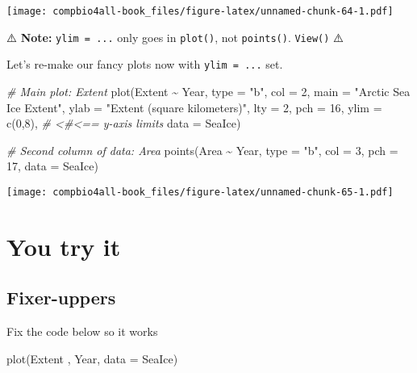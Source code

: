 \documentclass[
]{book}
\newenvironment{Shaded}{\begin{snugshade}}{\end{snugshade}}
\newcommand{\AttributeTok}[1]{\textcolor[rgb]{0.77,0.63,0.00}{#1}}
\newcommand{\CommentTok}[1]{\textcolor[rgb]{0.56,0.35,0.01}{\textit{#1}}}
\newcommand{\DecValTok}[1]{\textcolor[rgb]{0.00,0.00,0.81}{#1}}
\newcommand{\FunctionTok}[1]{\textcolor[rgb]{0.00,0.00,0.00}{#1}}
\newcommand{\NormalTok}[1]{#1}
\newcommand{\SpecialCharTok}[1]{\textcolor[rgb]{0.00,0.00,0.00}{#1}}
\newcommand{\StringTok}[1]{\textcolor[rgb]{0.31,0.60,0.02}{#1}}
\begin{document}
\texttt{[image: compbio4all-book\_files/figure-latex/unnamed-chunk-64-1.pdf]}

⚠️ \textbf{Note:} \texttt{ylim\ =\ ...} only goes in \texttt{plot()}, not \texttt{points()}. \texttt{View()} ⚠️

Let's re-make our fancy plots now with \texttt{ylim\ =\ ...} set.

\begin{Shaded}
\begin{Highlighting}[]
\CommentTok{\# Main plot: Extent}
\FunctionTok{plot}\NormalTok{(Extent }\SpecialCharTok{\textasciitilde{}}\NormalTok{ Year,  }
     \AttributeTok{type =} \StringTok{"b"}\NormalTok{,     }
     \AttributeTok{col =} \DecValTok{2}\NormalTok{,       }
     \AttributeTok{main =} \StringTok{"Arctic Sea Ice Extent"}\NormalTok{, }
     \AttributeTok{ylab =} \StringTok{"Extent (square kilometers)"}\NormalTok{,}
     \AttributeTok{lty =} \DecValTok{2}\NormalTok{,        }
     \AttributeTok{pch =} \DecValTok{16}\NormalTok{,       }
     \AttributeTok{ylim =} \FunctionTok{c}\NormalTok{(}\DecValTok{0}\NormalTok{,}\DecValTok{8}\NormalTok{), }\CommentTok{\# \textless{}\#\textless{}== y{-}axis limits}
     \AttributeTok{data =}\NormalTok{ SeaIce)  }

\CommentTok{\# Second column of data: Area}
\FunctionTok{points}\NormalTok{(Area }\SpecialCharTok{\textasciitilde{}}\NormalTok{ Year,}
       \AttributeTok{type =} \StringTok{"b"}\NormalTok{,}
       \AttributeTok{col =} \DecValTok{3}\NormalTok{,}
       \AttributeTok{pch =} \DecValTok{17}\NormalTok{,}
       \AttributeTok{data =}\NormalTok{ SeaIce)}
\end{Highlighting}
\end{Shaded}

\texttt{[image: compbio4all-book\_files/figure-latex/unnamed-chunk-65-1.pdf]}

\hypertarget{you-try-it}{%
\section{You try it}\label{you-try-it}}

\hypertarget{fixer-uppers}{%
\subsection{Fixer-uppers}\label{fixer-uppers}}

Fix the code below so it works

\begin{Shaded}
\begin{Highlighting}[]
\FunctionTok{plot}\NormalTok{(Extent , Year,  }
     \AttributeTok{data =}\NormalTok{ SeaIce)  }
\end{Highlighting}
\end{Shaded}
\end{document}
